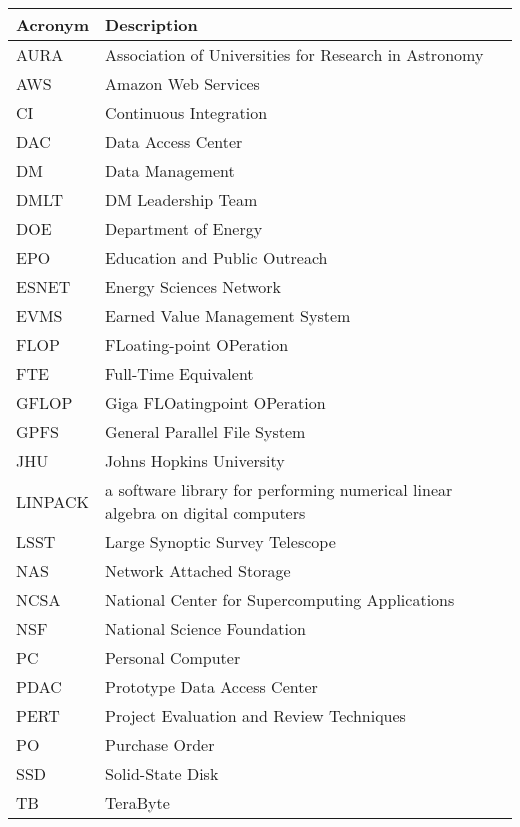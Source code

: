 \addtocounter{table}{-1}
\begin{longtable}{|l|p{}|}\hline 
\textbf{Acronym} & \textbf{Description}  \\\hline
AURA&Association of Universities for Research in Astronomy \\\hline
AWS&Amazon Web Services \\\hline
CI&Continuous Integration \\\hline
DAC&Data Access Center \\\hline
DM&Data Management \\\hline
DMLT&DM Leadership Team \\\hline
DOE&Department of Energy \\\hline
EPO&Education and Public Outreach \\\hline
ESNET&Energy Sciences Network \\\hline
EVMS&Earned Value Management System \\\hline
FLOP&FLoating-point OPeration \\\hline
FTE&Full-Time Equivalent \\\hline
GFLOP&Giga FLOatingpoint OPeration \\\hline
GPFS&General Parallel File System \\\hline
JHU&Johns Hopkins University \\\hline
LINPACK&a software library for performing numerical linear algebra on digital computers \\\hline
LSST&Large Synoptic Survey Telescope \\\hline
NAS&Network Attached Storage \\\hline
NCSA&National Center for Supercomputing Applications \\\hline
NSF&National Science Foundation \\\hline
PC&Personal Computer \\\hline
PDAC&Prototype Data Access Center \\\hline
PERT&Project Evaluation and Review Techniques \\\hline
PO&Purchase Order \\\hline
SSD&Solid-State Disk \\\hline
TB&TeraByte \\\hline
\end{longtable} 
